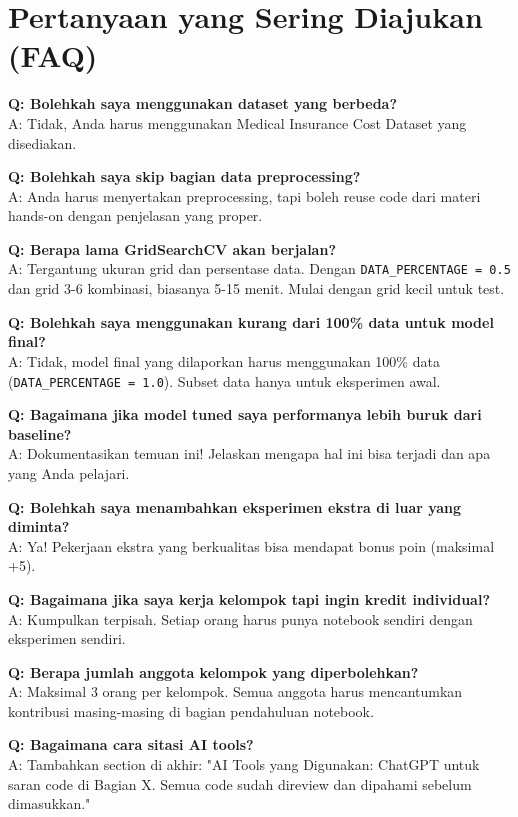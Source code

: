 \documentclass[12pt,a4paper]{article}
\begin{document}
\section{Pertanyaan yang Sering Diajukan (FAQ)}

\textbf{Q: Bolehkah saya menggunakan dataset yang berbeda?} \\
A: Tidak, Anda harus menggunakan Medical Insurance Cost Dataset yang disediakan.

\textbf{Q: Bolehkah saya skip bagian data preprocessing?} \\
A: Anda harus menyertakan preprocessing, tapi boleh reuse code dari materi hands-on dengan penjelasan yang proper.

\textbf{Q: Berapa lama GridSearchCV akan berjalan?} \\
A: Tergantung ukuran grid dan persentase data. Dengan \texttt{DATA\_PERCENTAGE = 0.5} dan grid 3-6 kombinasi, biasanya 5-15 menit. Mulai dengan grid kecil untuk test.

\textbf{Q: Bolehkah saya menggunakan kurang dari 100\% data untuk model final?} \\
A: Tidak, model final yang dilaporkan harus menggunakan 100\% data (\texttt{DATA\_PERCENTAGE = 1.0}). Subset data hanya untuk eksperimen awal.

\textbf{Q: Bagaimana jika model tuned saya performanya lebih buruk dari baseline?} \\
A: Dokumentasikan temuan ini! Jelaskan mengapa hal ini bisa terjadi dan apa yang Anda pelajari.

\textbf{Q: Bolehkah saya menambahkan eksperimen ekstra di luar yang diminta?} \\
A: Ya! Pekerjaan ekstra yang berkualitas bisa mendapat bonus poin (maksimal +5).

\textbf{Q: Bagaimana jika saya kerja kelompok tapi ingin kredit individual?} \\
A: Kumpulkan terpisah. Setiap orang harus punya notebook sendiri dengan eksperimen sendiri.

\textbf{Q: Berapa jumlah anggota kelompok yang diperbolehkan?} \\
A: Maksimal 3 orang per kelompok. Semua anggota harus mencantumkan kontribusi masing-masing di bagian pendahuluan notebook.

\textbf{Q: Bagaimana cara sitasi AI tools?} \\
A: Tambahkan section di akhir: "AI Tools yang Digunakan: ChatGPT untuk saran code di Bagian X. Semua code sudah direview dan dipahami sebelum dimasukkan."
\end{document}
